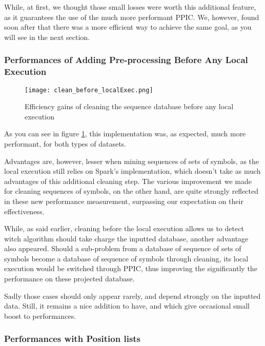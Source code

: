 \documentclass{eplmastersthesis}
\begin{document}
While, at first, we thought those small losses were worth this additional feature, as it guarantees the use of the much more performant PPIC. We, however, found soon after that there was a more efficient way to achieve the same goal, as you will see in the next section.

\subsubsection{Performances of Adding Pre-processing Before Any Local Execution}

\begin{figure}[h]
  \centering
  \texttt{[image: clean\_before\_localExec.png]}
  \caption{Efficiency gains of cleaning the sequence database before any local execution}
  \label{fig:cleaning_before_local_exec}
\end{figure}

As you can see in figure \ref{fig:cleaning_before_local_exec}, this implementation was, as expected, much more performant, for both types of datasets. \newline

Advantages are, however, lesser when mining sequences of sets of symbols, as the local execution still relies on Spark's implementation, which doesn't take as much advantages of this additional cleaning step. The various improvement we made for cleaning sequences of symbols, on the other hand, are quite strongly reflected in these new performance measurement, surpassing our expectation on their effectiveness.

While, as said earlier, cleaning before the local execution allows us to detect witch algorithm should take charge the inputted database, another advantage also appeared. Should a sub-problem from a database of sequence of sets of symbols become a database of sequence of symbols through cleaning, its local execution would be switched through PPIC, thus improving the significantly the performance on these projected database. \newline

Sadly those cases should only appear rarely, and depend strongly on the inputted data. Still, it remains a nice addition to have, and which give occasional small boost to performances.

\subsubsection{Performances with Position lists}
\end{document}
